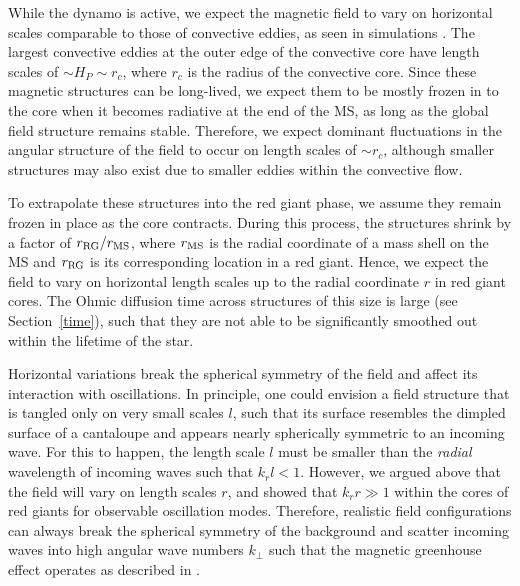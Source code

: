 While the dynamo is active, we expect the magnetic field to vary on horizontal scales comparable to those of convective eddies, as seen in simulations \citep{Featherstone_2009}. The largest convective eddies at the outer edge of the convective core have length scales of $\sim \! H_P \sim \! r_c$, where $r_c$ is the radius of the convective core. Since these magnetic structures can be long-lived, we expect them to be mostly frozen in to the core when it becomes radiative at the end of the MS, as long as the global field structure remains stable. Therefore, we expect dominant fluctuations in the angular structure of the field to occur on length scales of $\sim \! r_c$, although smaller structures may also exist due to smaller eddies within the convective flow.

To extrapolate these structures into the red giant phase, we assume they remain frozen in place as the core contracts. During this process, the structures shrink by a factor of $r_{\rm RG}/r_{\rm MS}$, where $r_{\rm MS}$ is the radial coordinate of a mass shell on the MS and $r_{\rm RG}$ is its corresponding location in a red giant. Hence, we expect the field to vary on horizontal length scales up to the radial coordinate $r$ in red giant cores. The Ohmic diffusion time across structures of this size is large (see Section~\ref{time}), such that they are not able to be significantly smoothed out within the lifetime of the star.

Horizontal variations break the spherical symmetry of the field and affect its interaction with oscillations. In principle, one could envision a field structure that is tangled only on very small scales $l$, such that its surface resembles the dimpled surface of a cantaloupe and appears nearly spherically symmetric to an incoming wave. For this to happen, the length scale $l$ must be smaller than the {\it radial} wavelength of incoming waves such that $k_r l < 1$. However, we argued above that the field will vary on length scales $r$, and \citet{Fuller_2015} showed that $k_r r \gg 1$ within the cores of red giants for observable oscillation modes. Therefore, realistic field configurations can always break the spherical symmetry of the background and scatter incoming waves into high angular wave numbers $k_\perp$ such that the magnetic greenhouse effect operates as described in \citet{Fuller_2015}.